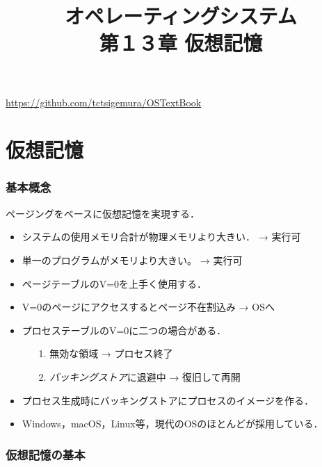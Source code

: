 \documentclass{beamer}                   %
\begin{document}
\title[仮想記憶]{オペレーティングシステム\\第１３章 仮想記憶}
\date{}
\begin{frame}
  \titlepage
  \centerline{\url{https://github.com/tctsigemura/OSTextBook}}
\end{frame}


\section{仮想記憶}
\begin{frame}
  \frametitle{基本概念}
  ページングをベースに仮想記憶を実現する．
  \begin{itemize}
  \item システムの使用メモリ合計が物理メモリより大きい． → 実行可
  \item 単一のプログラムがメモリより大きい。 → 実行可
  \item ページテーブルのV=0を上手く使用する．
  \item V=0のページにアクセスするとページ不在割込み → OSへ
  \item プロセステーブルのV=0に二つの場合がある．
    \begin{itemize}
      \item[1.] 無効な領域 → プロセス終了
      \item[2.] \emph{バッキングストア}に退避中 → 復旧して再開
    \end{itemize}
  \item プロセス生成時にバッキングストアにプロセスのイメージを作る．
  \item Windows，macOS，Linux等，現代のOSのほとんどが採用している．
  \end{itemize}
\end{frame}

\begin{frame}
  \frametitle{仮想記憶の基本}
\end{frame}
\end{document}
